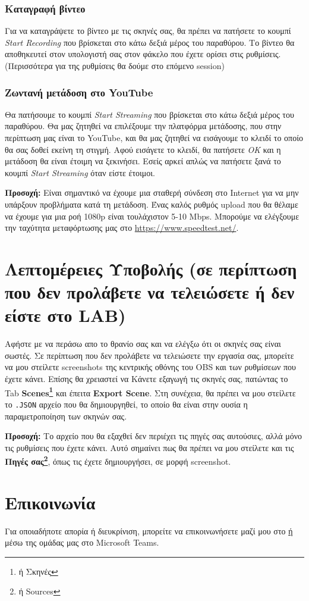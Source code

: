 \documentclass[12pt,a4paper]{article}
\begin{document}
\subsubsection{Καταγραφή βίντεο}
Για να καταγράψετε το βίντεο με τις σκηνές σας, θα πρέπει να πατήσετε το κουμπί \textit{Start Recording} που βρίσκεται
στο κάτω δεξιά μέρος του παραθύρου. Το βίντεο θα αποθηκευτεί στον υπολογιστή σας στον φάκελο που έχετε ορίσει στις ρυθμίσεις.
(Περισσότερα για της ρυθμίσεις θα δούμε στο επόμενο session)
\subsubsection{Ζωντανή μετάδοση στο YouTube}
Θα πατήσουμε το κουμπί \textit{Start Streaming} που βρίσκεται στο κάτω δεξιά μέρος του παραθύρου. Θα μας ζητηθεί να
επιλέξουμε την πλατφόρμα μετάδοσης, που στην περίπτωση μας είναι το YouTube, και θα μας ζητηθεί να εισάγουμε το κλειδί
το οποίο θα σας δοθεί εκείνη τη στιγμή. Αφού εισάγετε το κλειδί, θα πατήσετε \textit{OK} και η μετάδοση θα είναι έτοιμη να 
ξεκινήσει. Εσείς αρκεί απλώς να πατήσετε ξανά το κουμπί \textit{Start Streaming} όταν είστε έτοιμοι.
\begin{info}
\textbf{Προσοχή:} Είναι σημαντικό να έχουμε μια σταθερή σύνδεση στο Internet για να μην υπάρξουν προβλήματα κατά τη μετάδοση.
Ένας καλός ρυθμός upload που θα θέλαμε να έχουμε για μια ροή 1080p είναι τουλάχιστον 5-10 Mbps.
Μπορούμε να ελέγξουμε την ταχύτητα μεταφόρτωσης μας στο \url{https://www.speedtest.net/}.
\end{info}






\section*{Λεπτομέρειες Υποβολής (σε περίπτωση που δεν προλάβετε να τελειώσετε ή δεν είστε στο LAB)}
\noindent Αφήστε με να περάσω απο το θρανίο σας και να ελέγξω ότι οι σκηνές σας είναι σωστές.
Σε περίπτωση που δεν προλάβετε να τελειώσετε την εργασία σας, μπορείτε να μου στείλετε
screenshots της κεντρικής οθόνης του OBS και των ρυθμίσεων που έχετε κάνει. Επίσης θα χρειαστεί να
Κάνετε εξαγωγή τις σκηνές σας, πατώντας το Tab \textbf{Scenes\footnote{ή Σκηνές}} και έπειτα
\textbf{Export Scene}. Στη συνέχεια, θα πρέπει να μου στείλετε το \texttt{.JSON} αρχείο που θα δημιουργηθεί,
το οποίο θα είναι στην ουσία η παραμετροποίηση των σκηνών σας.
\begin{info}
  \textbf{Προσοχή:} Το αρχείο που θα εξαχθεί δεν περιέχει τις πηγές σας αυτούσιες, αλλά μόνο τις ρυθμίσεις που έχετε κάνει.
  Αυτό σημαίνει πως θα πρέπει να μου στείλετε και τις \textbf{Πηγές σας\footnote{ή Sources}}, όπως τις έχετε δημιουργήσει, σε μορφή screenshot.
\end{info}
\section*{Επικοινωνία}
Για οποιαδήποτε απορία ή διευκρίνιση, μπορείτε να επικοινωνήσετε μαζί μου στο \href{mailto:dit17046@uop.gr} ή μέσω της
ομάδας μας στο Microsoft Teams.
\end{document}
